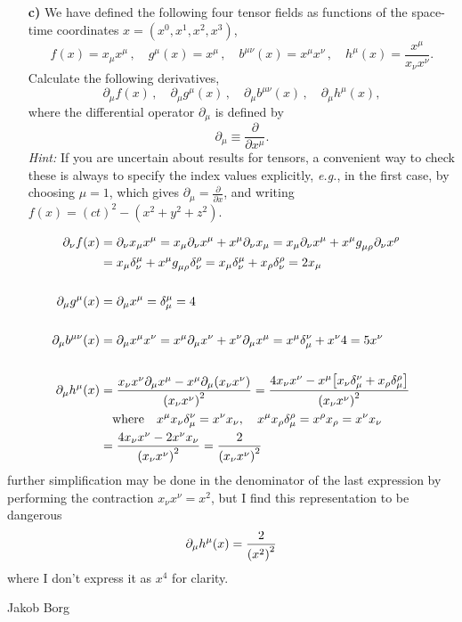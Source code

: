 \documentclass[11pt,a4paper]{report}
\newcounter{excount}[chapter]
\newenvironment{exercise}[1][]{\addtocounter{excount}{1} \noindent {\bf Problem
    \arabic{excount} \ \ #1}\hspace{2mm}}{\vspace{4mm}}
\newenvironment{solution}[1][]
    {\begin{tcolorbox}[title=Solution #1,halign lower=right,breakable]
    }
    {
    \tcblower Jakob Borg
    \end{tcolorbox}
	\vspace{5mm}
    }
\newcommand{\qwhere}
{
\qq{where}
}
\begin{document}
\begin{exercise}
\begin{itemize}
\item[\bf c)] We have defined the following four tensor fields as functions of the space-time coordinates $x=(x^0,x^1,x^2,x^3)$,
\begin{equation}
f(x) =x_{\mu}x^{\mu}\,,\quad g^{\mu}(x) =x^{\mu}\,,\quad b^{\mu\nu}(x) =x^{\mu}x^{\nu}\,,\quad h^{\mu} (x) =\frac{x^{\mu}}{x_{\nu}x^{\nu}}.
\end{equation}
Calculate the following derivatives, 
\begin{equation}
\partial_{\mu} f(x)\,,\quad \partial_{\mu}g^{\mu}(x)\,,\quad \partial_{\mu} b^{\mu\nu}(x)\,,\quad \partial_{\mu} h^{\mu} (x),
\end{equation}
where the differential operator $\partial_{\mu}$ is defined by
\begin{equation}
\partial_{\mu}\equiv \frac{\partial}{\partial x^\mu}.
\end{equation}
{\it Hint:} If you are uncertain about results for tensors, a convenient way to check these is always to specify the index values explicitly, {\it e.g.}, in the first case, by choosing $\mu=1$, which gives $\partial_{\mu}=\frac{\partial}{\partial x}$, and writing $f(x)=(ct)^2-(x^2+y^2+z^2)$.
\end{itemize}
\begin{solution}[\bf 1.c]
\begin{align*}
\partial_\nu f(x) &=\partial_\nu x_\mu x^\mu = x_\mu \partial_\nu x^\mu + x^\mu \partial_\nu x_\mu = x_\mu \partial_\nu x^\mu + x^\mu g\indices{_\mu_\rho} \partial_\nu x^\rho
\\
&= x_\mu \delta_\nu^\mu + x^\mu g\indices{_\mu_\rho} \delta_\nu^\rho = x_\mu \delta_\nu^\mu + x_\rho \delta_\nu^\rho = 2x_\mu
\\
\\
\partial_\mu g^\mu(x) &= \partial_\mu x^\mu = \delta_\mu^\mu = 4
\\
\\
\partial_\mu b\indices{^\mu^\nu}(x) &= \partial_\mu x^\mu x^\nu = x^\mu \partial_\mu x^\nu + x^\nu \partial_\mu x^\mu = x^\mu \delta_\mu^\nu + x^\nu 4= 5x^\nu
\\
\\
\partial_\mu h^\mu(x) &= \frac{x_\nu x^\nu \partial_\mu x^\mu - x^\mu \partial_\mu \qty(x_\nu x^\nu)}{\qty(x_\nu x^\nu)^2} = \frac{4 x_\nu x^\nu- x^\mu \qty[ x_\nu \delta_\mu^\nu + x_\rho \delta_\mu^\rho ]}{\qty(x_\nu x^\nu)^2}
\\
& \qwhere x^\mu x_\nu \delta_\mu^\nu = x^\nu x_\nu \qc x^\mu x_\rho \delta_\mu^\rho = x^\rho x_\rho = x^\nu x_\nu
\\
&= \frac{4 x_\nu x^\nu- 2 x^\nu x_\nu}{\qty(x_\nu x^\nu)^2} = \frac{2}{\qty(x_\nu x^\nu)^2}
\end{align*}
further simplification may be done in the denominator of the last expression by performing the contraction $x_\nu x^\nu = x^2$, but I find this representation to be dangerous
\[
\partial_\mu h^\mu (x) = \frac{2}{\qty(x^2)^2}
\]
where I don't express it as $x^4$ for clarity.
\end{solution}
\end{exercise}
\end{document}
